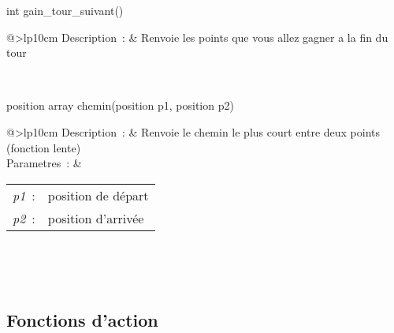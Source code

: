 \begin{minipage}{\linewidth}

\begin{lst-c++}
int gain_tour_suivant()
\end{lst-c++}

\noindent
\begin{tabular}[t]{@{\extracolsep{0pt}}>{\bfseries}lp{10cm}}
Description~: & Renvoie les points que vous allez gagner a la fin du tour \\







\end{tabular} \\[0.3cm]
\end{minipage}


\begin{minipage}{\linewidth}

\begin{lst-c++}
position array chemin(position p1, position p2)
\end{lst-c++}

\noindent
\begin{tabular}[t]{@{\extracolsep{0pt}}>{\bfseries}lp{10cm}}
Description~: & Renvoie le chemin le plus court entre deux points (fonction lente) \\


Parametres~: &
\begin{tabular}[t]{@{\extracolsep{0pt}}ll}
    
    
      
        \textsl{p1}~: & position de départ \\
      
    
      
        \textsl{p2}~: & position d'arrivée \\
      
    
  \end{tabular} \\






\end{tabular} \\[0.3cm]
\end{minipage}

\subsection{Fonctions d'action}


